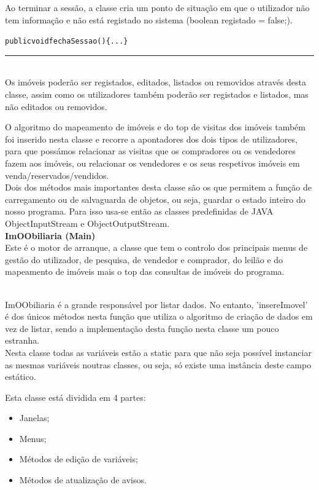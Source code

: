 \documentclass[12pt]{article}
\newenvironment{code}                    
{\textbf{
} \hspace{1cm} \hrulefill \\ 
\smallskip 
\begin{center}
\begin{minipage}{0.9\textwidth} 
\begin{alltt}\small}
{\end{alltt}
\end{minipage}
\end{center}
\hrule\smallskip
}
\begin{document}
Ao terminar a sessão, a classe cria um ponto de situação em que o utilizador não tem informação e não está registado no sistema (boolean registado = false;).
\newline
\begin{code}
public void fechaSessao()\{... \}
\end{code}
~\\

Os imóveis poderão ser registados, editados, listados ou removidos através desta classe, assim como os utilizadores também poderão ser registados e listados, mas não editados ou removidos.

O algoritmo do mapeamento de imóveis e do top de visitas dos imóveis também foi inserido nesta classe e recorre a apontadores dos dois tipos de utilizadores, para que possámos relacionar as visitas que os compradores ou os vendedores fazem aos imóveis, ou relacionar os vendedores e os seus respetivos imóveis em venda/reservados/vendidos.
~\\

Dois dos métodos mais importantes desta classe são os que permitem a função de carregamento ou de salvaguarda de objetos, ou seja, guardar o estado inteiro do nosso programa.
Para isso usa-se então as classes predefinidas de JAVA ObjectInputStream e ObjectOutputStream. 
~\\

\textbf{ImOObiliaria (Main)}
\newline
~\\

Este é o motor de arranque, a classe que tem o controlo dos principais menus de gestão do utilizador, de pesquisa, de vendedor e comprador, do leilão e do mapeamento de imóveis mais o top das consultas de imóveis do programa.

~\\

ImOObiliaria é a grande responsável por listar dados. No entanto, 'insereImovel' é dos únicos métodos nesta função que utiliza o algoritmo de criação de dados em vez de listar, sendo a implementação desta função nesta classe um pouco estranha.
~\\

Nesta classe todas as variáveis estão a static para que não seja possível instanciar as mesmas
variáveis noutras classes, ou seja, só existe uma instância deste campo estático.

Esta classe está dividida em 4 partes:
\newline
\begin{itemize}
\item Janelas;
\item Menus;
\item Métodos de edição de variáveis;
\item Métodos de atualização de avisos.
\end{itemize}
\end{document}
